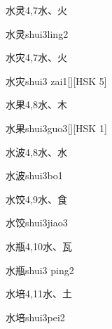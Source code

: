 \begin{entry}{水灵}{4,7}{⽔、⽕}
  \begin{phonetics}{水灵}{shui3ling2}
  \end{phonetics}
\end{entry}

\begin{entry}{水灾}{4,7}{⽔、⽕}
  \begin{phonetics}{水灾}{shui3 zai1}[][HSK 5]
  \end{phonetics}
\end{entry}

\begin{entry}{水果}{4,8}{⽔、⽊}
  \begin{phonetics}{水果}{shui3guo3}[][HSK 1]
  \end{phonetics}
\end{entry}

\begin{entry}{水波}{4,8}{⽔、⽔}
  \begin{phonetics}{水波}{shui3bo1}
  \end{phonetics}
\end{entry}

\begin{entry}{水饺}{4,9}{⽔、⾷}
  \begin{phonetics}{水饺}{shui3jiao3}
  \end{phonetics}
\end{entry}

\begin{entry}{水瓶}{4,10}{⽔、⽡}
  \begin{phonetics}{水瓶}{shui3 ping2}
  \end{phonetics}
\end{entry}

\begin{entry}{水培}{4,11}{⽔、⼟}
  \begin{phonetics}{水培}{shui3pei2}
  \end{phonetics}
\end{entry}

